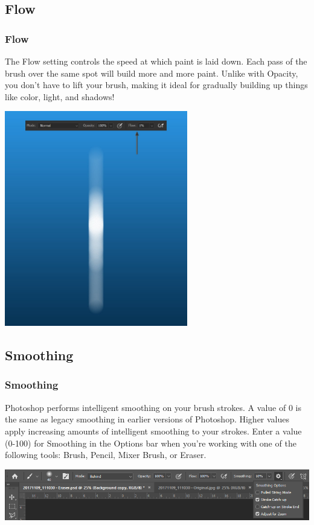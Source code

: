 \documentclass{beamer}
\begin{document}
\subsection{Flow}	
\begin{frame}
	\frametitle{Flow}
	\begin{outline}
		\1 The Flow setting controls the speed at which paint is laid down. 
		\1 Each pass of the brush over the same spot will build more and more paint. 
		\2 Unlike with Opacity, you don’t have to lift your brush, making it ideal for gradually building up things like color, light, and shadows!
	\end{outline}
	\begin{center}
		\includegraphics[width = 0.6\textwidth]{images/2.7.jpg}
	\end{center}
\end{frame}

\subsection{Smoothing}	
\begin{frame}
	\frametitle{Smoothing}
	\begin{outline}
		\1 Photoshop performs intelligent smoothing on your brush strokes.
		\1 A value of 0 is the same as legacy smoothing in earlier versions of Photoshop. 
		\2 Higher values apply increasing amounts of intelligent smoothing to your strokes.
		\1 Enter a value (0-100) for Smoothing in the Options bar when you're working with one of the following tools: Brush, Pencil, Mixer Brush, or Eraser. 
	\end{outline}
	\begin{center}
		\includegraphics[width = 1.0\textwidth]{images/smoothing.png}
	\end{center}
\end{frame}
\end{document}
